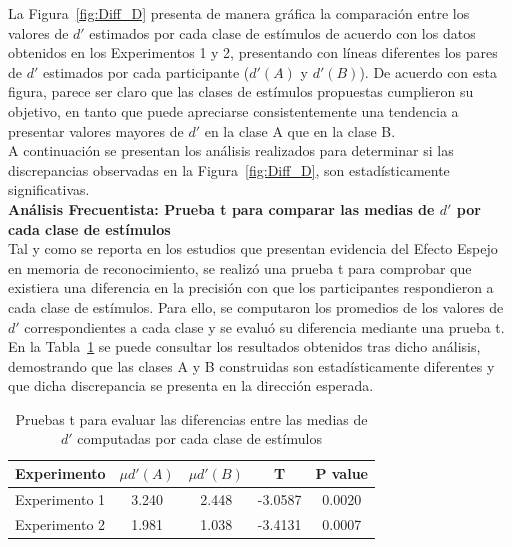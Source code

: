 La Figura~\ref{fig:Diff_D} presenta de manera gráfica la comparación entre los valores de $d'$ estimados por cada clase de estímulos de acuerdo con los datos obtenidos en los Experimentos 1 y 2, presentando con líneas diferentes los pares de $d'$ estimados por cada participante ($d'(A)$ y $d'(B)$). De acuerdo con esta figura, parece ser claro que las clases de estímulos propuestas cumplieron su objetivo, en tanto que puede apreciarse consistentemente una tendencia a presentar valores mayores de $d'$ en la clase A que en la clase B.\\

A continuación se presentan los análisis realizados para determinar si las discrepancias observadas en la Figura~\ref{fig:Diff_D}, son estadísticamente significativas.\\

\textbf{Análisis Frecuentista: Prueba t para comparar las medias de $d'$ por cada clase de estímulos}\\

Tal y como se reporta en los estudios que presentan evidencia del Efecto Espejo en memoria de reconocimiento, se realizó una prueba t para comprobar que existiera una diferencia en la precisión con que los participantes respondieron a cada clase de estímulos. Para ello, se computaron los promedios de los valores de $d'$ correspondientes a cada clase y se evaluó su diferencia mediante una prueba t. En la Tabla~\ref{Tabla_t-Dprimas} se puede consultar los resultados obtenidos tras dicho análisis, demostrando que las clases A y B construidas son estadísticamente diferentes y que dicha discrepancia se presenta en la dirección esperada.\\

\begin{table}[h]
\caption[Prueba t para evaluar las diferencias entre las medias de $d'$ por clase de estímulos]{Pruebas t para evaluar las diferencias entre las medias de $d'$ computadas por cada clase de estímulos}
\label{Tabla_t-Dprimas}
\centering
\begin{tabular}{l | c c c c}
\toprule
\textbf{Experimento} & \textbf{$\mu d'(A)$} & \textbf{$\mu d'(B)$} & \textbf{T}  & \textbf{P value}\\
\midrule
Experimento 1 & 3.240 & 2.448 & -3.0587 & 0.0020 \\
Experimento 2 & 1.981 & 1.038 & -3.4131 & 0.0007 \\
\bottomrule
\end{tabular}
\end{table}

